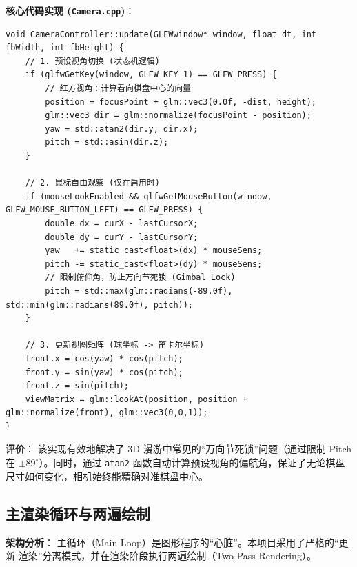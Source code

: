 \documentclass[a4paper]{article}
\begin{document}
\textbf{核心代码实现 (\texttt{Camera.cpp})}：
\begin{lstlisting}[caption={摄像机更新逻辑}]
void CameraController::update(GLFWwindow* window, float dt, int fbWidth, int fbHeight) {
    // 1. 预设视角切换 (状态机逻辑)
    if (glfwGetKey(window, GLFW_KEY_1) == GLFW_PRESS) {
        // 红方视角：计算看向棋盘中心的向量
        position = focusPoint + glm::vec3(0.0f, -dist, height);
        glm::vec3 dir = glm::normalize(focusPoint - position);
        yaw = std::atan2(dir.y, dir.x);
        pitch = std::asin(dir.z);
    }
    
    // 2. 鼠标自由观察 (仅在启用时)
    if (mouseLookEnabled && glfwGetMouseButton(window, GLFW_MOUSE_BUTTON_LEFT) == GLFW_PRESS) {
        double dx = curX - lastCursorX;
        double dy = curY - lastCursorY;
        yaw   += static_cast<float>(dx) * mouseSens;
        pitch -= static_cast<float>(dy) * mouseSens;
        // 限制俯仰角，防止万向节死锁 (Gimbal Lock)
        pitch = std::max(glm::radians(-89.0f), std::min(glm::radians(89.0f), pitch));
    }
    
    // 3. 更新视图矩阵 (球坐标 -> 笛卡尔坐标)
    front.x = cos(yaw) * cos(pitch);
    front.y = sin(yaw) * cos(pitch);
    front.z = sin(pitch);
    viewMatrix = glm::lookAt(position, position + glm::normalize(front), glm::vec3(0,0,1));
}
\end{lstlisting}

\textbf{评价}：
该实现有效地解决了 3D 漫游中常见的“万向节死锁”问题（通过限制 Pitch 在 $\pm 89^\circ$）。同时，通过 \texttt{atan2} 函数自动计算预设视角的偏航角，保证了无论棋盘尺寸如何变化，相机始终能精确对准棋盘中心。

\subsection{主渲染循环与两遍绘制}

\textbf{架构分析}：
主循环（Main Loop）是图形程序的“心脏”。本项目采用了严格的“更新-渲染”分离模式，并在渲染阶段执行两遍绘制（Two-Pass Rendering）。
\end{document}
